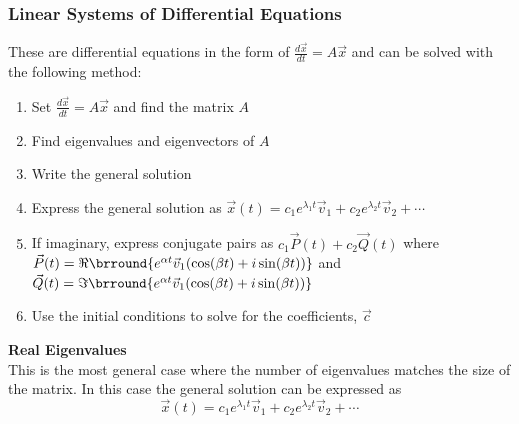 \subsubsection{Linear Systems of Differential Equations}
These are differential equations in the form of $\frac{d\vec{x}}{dt}=A\vec{x}$ and can be solved with the following method:
\begin{enumerate}
    \item Set $\frac{d\vec{x}}{dt}=A\vec{x}$ and find the matrix $A$
    \item Find eigenvalues and eigenvectors of $A$
    \item Write the general solution
    \item Express the general solution as $\vec{x}(t)=c_1e^{\lambda_1t}\vec{v}_1+c_2e^{\lambda_2t}\vec{v}_2+\cdots$
    \item If imaginary, express conjugate pairs as $c_1\vec{P}(t)+c_2\vec{Q}(t)$ where $\vec{P}(t)=\Re\brround{e^{\alpha t}\vec{v}_1(\cos(\beta t)+i\sin(\beta t))}$ and $\vec{Q}(t)=\Im\brround{e^{\alpha t}\vec{v}_1(\cos(\beta t)+i\sin(\beta t))}$
    \item Use the initial conditions to solve for the coefficients, $\vec{c}$
\end{enumerate}
\textbf{Real Eigenvalues}\\
This is the most general case where the number of eigenvalues matches the size of the matrix. In this case the general solution can be expressed as
$$\vec{x}(t)=c_1e^{\lambda_1 t}\vec{v}_1+c_2e^{\lambda_2 t}\vec{v}_2+\cdots$$
